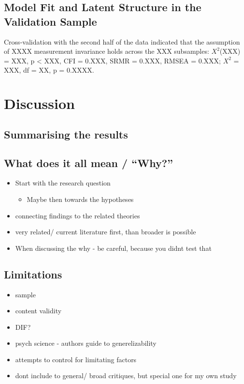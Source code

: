 \documentclass[
  12pt,
  a4paper,
  twoside]{article}
\providecommand{\tightlist}{%
  \setlength{\itemsep}{0pt}\setlength{\parskip}{0pt}}
\begin{document}
\subsection{Model Fit and Latent Structure in the Validation
Sample}\label{model-fit-and-latent-structure-in-the-validation-sample}

Cross-validation with the second half of the data indicated that the
assumption of XXXX measurement invariance holds across the XXX
subsamples: \(X^{2}\)(XXX) = XXX, p \textless{} XXX, CFI = 0.XXX, SRMR =
0.XXX, RMSEA = 0.XXX; \(X^{2}\) = XXX, df = XX, p = 0.XXXX.

\section{Discussion}\label{discussion}

\subsection{Summarising the results}\label{summarising-the-results}

\subsection{What does it all mean /
``Why?''}\label{what-does-it-all-mean-why}

\begin{itemize}
\tightlist
\item
  Start with the research question

  \begin{itemize}
  \tightlist
  \item
    Maybe then towards the hypotheses
  \end{itemize}
\item
  connecting findings to the related theories
\item
  very related/ current literature first, than broader is possible
\item
  When discussing the why - be careful, because you didnt test that
\end{itemize}

\subsection{Limitations}\label{limitations}

\begin{itemize}
\tightlist
\item
  sample
\item
  content validity
\item
  DIF?
\item
  psych science - authors guide to generelizability
\item
  attempts to control for limitating factors
\item
  dont include to general/ broad critiques, but special one for my own
  study
\end{itemize}
\end{document}
